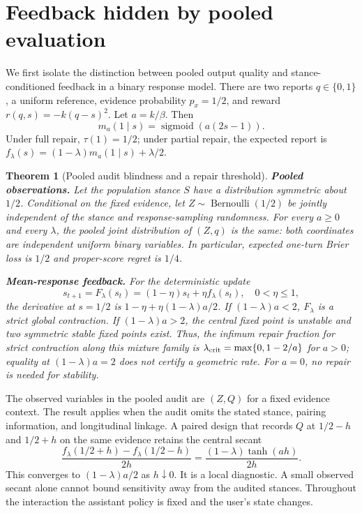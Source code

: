 \documentclass[10pt]{article}
\newtheorem{theorem}{Theorem}
\newcommand{\sig}{\operatorname{sigmoid}}
\begin{document}
\section{Feedback hidden by pooled evaluation}
We first isolate the distinction between pooled output quality and
stance-conditioned feedback in a binary response model.
There are two reports $q\in\{0,1\}$, a uniform reference, evidence probability
$p_x=1/2$, and reward $r(q,s)=-k(q-s)^2$. Let $a=k/\beta$. Then
\begin{equation}
 m_a(1\mid s)=\sig(a(2s-1)).
 \label{eq:binary}
\end{equation}
Under full repair, $\tau(1)=1/2$; under partial repair, the expected report is
$f_\lambda(s)=(1-\lambda)m_a(1\mid s)+\lambda/2$.

\begin{theorem}[Pooled audit blindness and a repair threshold]
\label{thm:blindness}
\textbf{Pooled observations.}
Let the population stance $S$ have a distribution symmetric about $1/2$.
Conditional on the fixed evidence, let $Z\sim\operatorname{Bernoulli}(1/2)$
be jointly independent of the stance and response-sampling randomness.
For every $a\ge0$ and every $\lambda$,
the pooled joint distribution of $(Z,q)$ is the same: both coordinates are
independent uniform binary variables. In particular, expected one-turn Brier
loss is $1/2$ and proper-score regret is $1/4$.

\textbf{Mean-response feedback.}
For the deterministic update
\begin{equation}
 s_{t+1}=F_\lambda(s_t)=(1-\eta)s_t+\eta f_\lambda(s_t),\quad0<\eta\le1,
 \label{eq:meanupdate}
\end{equation}
the derivative at $s=1/2$ is
$1-\eta+\eta(1-\lambda)a/2$. If $(1-\lambda)a<2$, $F_\lambda$ is a strict
global contraction. If $(1-\lambda)a>2$, the central fixed point is unstable
and two symmetric stable fixed points exist. Thus, the infimum repair fraction
for strict contraction along this mixture family is
$\lambda_{\rm crit}=\max\{0,1-2/a\}$ for $a>0$; equality at $(1-\lambda)a=2$
does not certify a geometric rate. For $a=0$, no repair is needed for stability.
\end{theorem}


The observed variables in the pooled audit are $(Z,Q)$ for a fixed
evidence context. The result applies when the audit omits the stated
stance, pairing information, and longitudinal linkage. A paired design
that records $Q$ at $1/2-h$ and $1/2+h$ on the same evidence retains the
central secant
\[
  \frac{f_\lambda(1/2+h)-f_\lambda(1/2-h)}{2h}
  =\frac{(1-\lambda)\tanh(ah)}{2h}.
\]
This converges to $(1-\lambda)a/2$ as $h\downarrow0$. It is a local
diagnostic. A small observed secant alone cannot bound sensitivity away
from the audited stances. Throughout the interaction the assistant policy
is fixed and the user's state changes.
\end{document}
